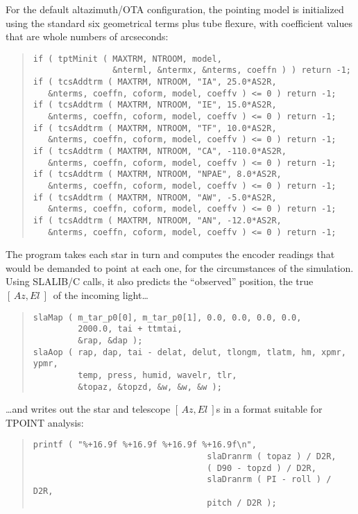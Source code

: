\documentclass[12pt,fleqn,twoside]{article}
\renewcommand{\_}{{\tt\char'137}}     %
\newcommand{\azel}      {$[\,Az,El~]$}
\begin{document}
For the default altazimuth/OTA configuration, the pointing model
is initialized using the standard six geometrical terms plus
tube flexure, with coefficient values that are whole numbers
of arcseconds:
\begin{quote}
\begin{small}
\begin{verbatim}
if ( tptMinit ( MAXTRM, NTROOM, model,
                &nterml, &ntermx, &nterms, coeffn ) ) return -1;
if ( tcsAddtrm ( MAXTRM, NTROOM, "IA", 25.0*AS2R,
   &nterms, coeffn, coform, model, coeffv ) <= 0 ) return -1;
if ( tcsAddtrm ( MAXTRM, NTROOM, "IE", 15.0*AS2R,
   &nterms, coeffn, coform, model, coeffv ) <= 0 ) return -1;
if ( tcsAddtrm ( MAXTRM, NTROOM, "TF", 10.0*AS2R,
   &nterms, coeffn, coform, model, coeffv ) <= 0 ) return -1;
if ( tcsAddtrm ( MAXTRM, NTROOM, "CA", -110.0*AS2R,
   &nterms, coeffn, coform, model, coeffv ) <= 0 ) return -1;
if ( tcsAddtrm ( MAXTRM, NTROOM, "NPAE", 8.0*AS2R,
   &nterms, coeffn, coform, model, coeffv ) <= 0 ) return -1;
if ( tcsAddtrm ( MAXTRM, NTROOM, "AW", -5.0*AS2R,
   &nterms, coeffn, coform, model, coeffv ) <= 0 ) return -1;
if ( tcsAddtrm ( MAXTRM, NTROOM, "AN", -12.0*AS2R,
   &nterms, coeffn, coform, model, coeffv ) <= 0 ) return -1;
\end{verbatim}\end{small}
\end{quote}
The program takes each star in turn and computes the encoder readings
that would be demanded to point at each one, for the circumstances
of the simulation.  Using SLALIB/C calls, it also predicts the
``observed'' position, the true \azel\ of the incoming light\ldots
\begin{quote}
\begin{small}
\begin{verbatim}
slaMap ( m_tar_p0[0], m_tar_p0[1], 0.0, 0.0, 0.0, 0.0,
         2000.0, tai + ttmtai,
         &rap, &dap );
slaAop ( rap, dap, tai - delat, delut, tlongm, tlatm, hm, xpmr, ypmr,
         temp, press, humid, wavelr, tlr,
         &topaz, &topzd, &w, &w, &w );
\end{verbatim}\end{small}
\end{quote}
\ldots and writes out the star and telescope \azel s in a
format suitable for TPOINT analysis:
\begin{quote}
\begin{small}
\begin{verbatim}
printf ( "%+16.9f %+16.9f %+16.9f %+16.9f\n",
                                   slaDranrm ( topaz ) / D2R,
                                   ( D90 - topzd ) / D2R,
                                   slaDranrm ( PI - roll ) / D2R,
                                   pitch / D2R );
\end{verbatim}\end{small}
\end{quote}
\end{document}
